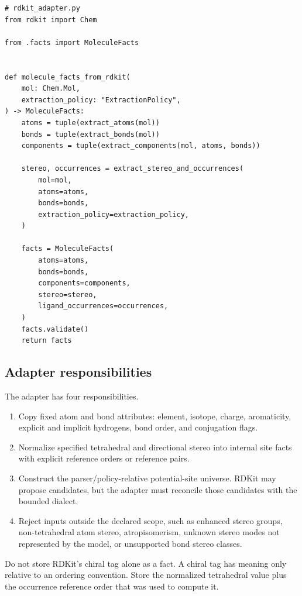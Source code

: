 \documentclass[10pt,a4paper]{article}
\theoremstyle{definition}
\theoremstyle{remark}
\begin{document}
\begin{lstlisting}
# rdkit_adapter.py
from rdkit import Chem

from .facts import MoleculeFacts


def molecule_facts_from_rdkit(
    mol: Chem.Mol,
    extraction_policy: "ExtractionPolicy",
) -> MoleculeFacts:
    atoms = tuple(extract_atoms(mol))
    bonds = tuple(extract_bonds(mol))
    components = tuple(extract_components(mol, atoms, bonds))

    stereo, occurrences = extract_stereo_and_occurrences(
        mol=mol,
        atoms=atoms,
        bonds=bonds,
        extraction_policy=extraction_policy,
    )

    facts = MoleculeFacts(
        atoms=atoms,
        bonds=bonds,
        components=components,
        stereo=stereo,
        ligand_occurrences=occurrences,
    )
    facts.validate()
    return facts
\end{lstlisting}

\subsection{Adapter responsibilities}

The adapter has four responsibilities.

\begin{enumerate}[leftmargin=*]
\item Copy fixed atom and bond attributes: element, isotope, charge, aromaticity,
      explicit and implicit hydrogens, bond order, and conjugation flags.
\item Normalize specified tetrahedral and directional stereo into internal site
      facts with explicit reference orders or reference pairs.
\item Construct the parser/policy-relative potential-site universe.  RDKit may
      propose candidates, but the adapter must reconcile those candidates with
      the bounded dialect.
\item Reject inputs outside the declared scope, such as enhanced stereo groups,
      non-tetrahedral atom stereo, atropisomerism, unknown stereo modes not
      represented by the model, or unsupported bond stereo classes.
\end{enumerate}

Do not store RDKit's chiral tag alone as a fact.  A chiral tag has meaning only
relative to an ordering convention.  Store the normalized tetrahedral value plus
the occurrence reference order that was used to compute it.
\end{document}
